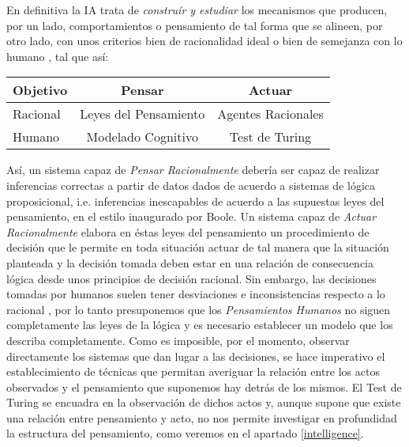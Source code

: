 \documentclass[12pt]{memoir}
\begin{document}
En definitiva la IA trata de \textit{construír y estudiar} los mecanismos que producen, por un lado, comportamientos o pensamiento de tal forma que se alineen, por otro lado, con unos criterios bien de racionalidad ideal o bien de semejanza con lo humano \parencite[p.5]{modernAI}, tal que así:
\begin{center}
\begin{tabular}{l || c | c}
  Objetivo & Pensar & Actuar \\
 \hline
 \hline
 Racional & Leyes del Pensamiento & Agentes Racionales \\
 \hline
 Humano & Modelado Cognitivo & Test de Turing \\
 \hline
\end{tabular}
\end{center}

Así, un sistema capaz de \textit{Pensar Racionalmente} debería ser capaz de realizar inferencias correctas a partir de datos dados de acuerdo a sistemas de lógica proposicional, i.e. inferencias inescapables de acuerdo a las supuestas leyes del pensamiento, en el estilo inaugurado por Boole. Un sistema capaz de \textit{Actuar Racionalmente} elabora en éstas leyes del pensamiento un procedimiento de decisión que le permite en toda situación actuar de tal manera que la situación planteada y la decisión tomada deben estar en una relación de consecuencia lógica desde unos principios de decisión racional. Sin embargo, las decisiones tomadas por humanos suelen tener desviaciones e inconsistencias respecto a lo racional \parencite{framingKahnemanTversky}, por lo tanto presuponemos que los \textit{Pensamientos Humanos} no siguen completamente las leyes de la lógica y es necesario establecer un modelo que los describa completamente. Como es imposible, por el momento, observar directamente los sistemas que dan lugar a las decisiones, se hace imperativo el establecimiento de técnicas que permitan averiguar la relación entre los actos observados y el pensamiento que suponemos hay detrás de los mismos. El Test de Turing se encuadra en la observación de dichos actos y, aunque supone que existe una relación entre pensamiento y acto, no nos permite investigar en profundidad la estructura del pensamiento, como veremos en el apartado \ref{intelligence}.
\end{document}
